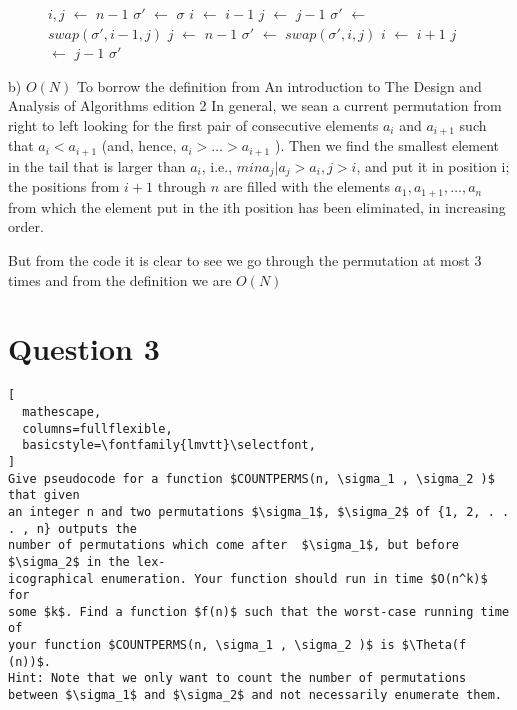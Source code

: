 \documentclass{article}
\newcommand*\Let[2]{\State #1 $\gets$ #2}
\newcommand*\Print[1]{\State \textbf{print} #1}
\newcommand*\GT[1]{\State \Goto{#1}}
\begin{document}
\begin{figure}[h]
\begin{algorithmic}[1]
  	\Let{$i,j$}{$n - 1$}
  	\Let{$\sigma'$}{$\sigma$}  
     	\Let{$i$}{$i - 1$} 
  	\EndWhile
    	\GT{end}
  	\EndIf
      	\Let{$j$}{$j - 1$} 
 	\EndWhile
  	\Let{$\sigma'$}{$swap(\sigma',i-1,j)$}   
 	\Let{$j$}{$n - 1$}
     	\Let{$\sigma'$}{$swap(\sigma',i,j)$}
     	\Let{$i$}{$i + 1$} 
     	\Let{$j$}{$j - 1$} 
  	\EndWhile
  	\Print $\sigma'$ \label{end}
 \EndFunction
\end{algorithmic}

\end{figure}
b) $O(N)$ \newline
To borrow the definition from An introduction to The Design and Analysis of Algorithms edition 2 \cite{Levitin126}
In general, we sean a current permutation from
right to left looking for the first pair of consecutive elements $a_i$ and $a_{i+ 1}$ such that
$a_i < a_{i+1}$ (and, hence, $a_i > \ldots > a_{i+1}$ ). Then we find the smallest element in the
tail that is larger than $a_i$, i.e., $min{a_j | a_j >a_i, j > i}$, and put it in position i; the
positions from $i + 1$ through $n$ are filled with the elements $a_1, a_{1+1},\ldots, a_n$ from
which the element put in the ith position has been eliminated, in increasing order.

But from the code it is clear to see we go through the permutation at most 3 times and from the 
definition we are $O(N)$\newline


 
\newpage
\section*{Question 3}
\begin{lstlisting}[
  mathescape,
  columns=fullflexible,
  basicstyle=\fontfamily{lmvtt}\selectfont,
]
Give pseudocode for a function $COUNTPERMS(n, \sigma_1 , \sigma_2 )$ that given
an integer n and two permutations $\sigma_1$, $\sigma_2$ of {1, 2, . . . , n} outputs the
number of permutations which come after  $\sigma_1$, but before $\sigma_2$ in the lex-
icographical enumeration. Your function should run in time $O(n^k)$ for
some $k$. Find a function $f(n)$ such that the worst-case running time of
your function $COUNTPERMS(n, \sigma_1 , \sigma_2 )$ is $\Theta(f (n))$.
Hint: Note that we only want to count the number of permutations
between $\sigma_1$ and $\sigma_2$ and not necessarily enumerate them.
\end{lstlisting}
\end{document}
